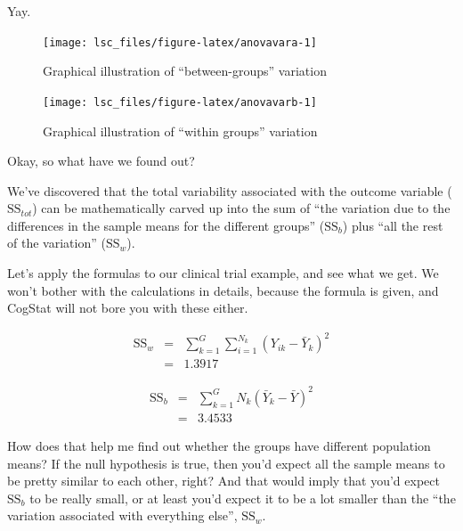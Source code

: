 \documentclass[
  11pt,
  a4paper,
  twoside,symmetric,openright]{book}
\theoremstyle{break}
\theoremstyle{break}
\begin{document}
Yay.



\begin{figure}

{\centering \texttt{[image: lsc\_files/figure-latex/anovavara-1]} 

}

\caption{Graphical illustration of ``between-groups'' variation}\label{fig:anovavara}
\end{figure}



\begin{figure}

{\centering \texttt{[image: lsc\_files/figure-latex/anovavarb-1]} 

}

\caption{Graphical illustration of ``within groups'' variation}\label{fig:anovavarb}
\end{figure}

Okay, so what have we found out?

We've discovered that the total variability associated with the outcome variable (\(\mbox{SS}_ {tot}\)) can be mathematically carved up into the sum of ``the variation due to the differences in the sample means for the different groups'' (\(\mbox{SS}_ {b}\)) plus ``all the rest of the variation'' (\(\mbox{SS}_ {w}\)).

Let's apply the formulas to our clinical trial example, and see what we get. We won't bother with the calculations in details, because the formula is given, and CogStat will not bore you with these either.

\[
\begin{array}{rcl}
\mbox{SS}_w &=& \sum_{k=1}^G \sum_{i=1}^{N_k} \left( Y_{ik} - \bar{Y}_k \right)^2
    \\
        &=& 1.3917
\end{array}
\]

\[
\begin{array}{rcl}
\mbox{SS}_b &=& \sum_{k=1}^G N_k \left( \bar{Y}_k - \bar{Y} \right)^2
    \\
        &=& 3.4533
\end{array}
\]

How does that help me find out whether the groups have different population means? If the null hypothesis is true, then you'd expect all the sample means to be pretty similar to each other, right? And that would imply that you'd expect \(\mbox{SS}_ {b}\) to be really small, or at least you'd expect it to be a lot smaller than the ``the variation associated with everything else'', \(\mbox{SS}_{w}\).
\end{document}
